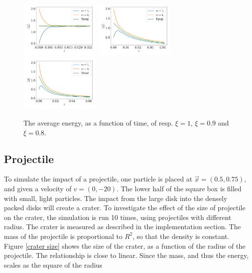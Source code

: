 \documentclass{article}
\begin{document}
            \begin{figure}[h]
                \centering
                \hspace{-5mm}
                \includegraphics[width=0.35\textwidth]{../plots/problem3/xi_0/energy_ex3.pdf}
                \hspace{-4mm}
                \includegraphics[width=0.35\textwidth]{../plots/problem3/xi_1/energy_ex3.pdf}
                \hspace{-4mm}
                \includegraphics[width=0.35\textwidth]{../plots/problem3/xi_2/energy_ex3.pdf}
                \hspace{-5mm}
                \caption{The average energy, as a function of time, of resp. $\xi=1$, $\xi=0.9$ and $\xi=0.8$.}
                \label{problem2 dist}
            \end{figure}

            \subsection*{Projectile}
            To simulate the impact of a projectile, one particle is placed at $\vec x = (0.5, 0.75)$, and given a velocity of $v = (0, -20)$. The lower half of the square box is filled with small, light particles. The impact from the large disk into the densely packed disks will create a crater. To investigate the effect of the size of projectile on the crater, the simulation is run 10 times, using projectiles with different radius. The crater is measured as described in the implementation section. The mass of the projectile is proportional to $R^2$, so that the density is constant. Figure \ref{crater size} shows the size of the crater, as a function of the radius of the projectile. The relationship is close to linear. Since the mass, and thus the energy, scales as the square of the radius
\end{document}
